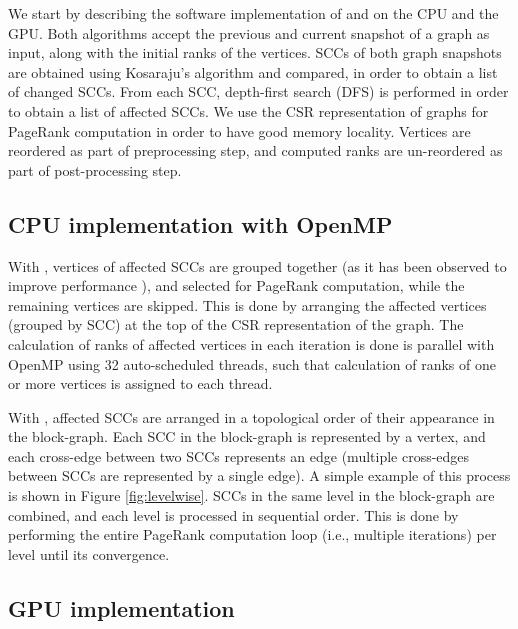 We start by describing the software implementation of \monolithicPR{} and \levelwisePR{} on the CPU and the GPU. Both algorithms accept the previous and current snapshot of a graph as input, along with the initial ranks of the vertices. SCCs of both graph snapshots are obtained using Kosaraju's algorithm \cite{scc-sharir81} and compared, in order to obtain a list of changed SCCs. From each SCC, depth-first search (DFS) is performed in order to obtain a list of affected SCCs. We use the CSR representation of graphs for PageRank computation in order to have good memory locality. Vertices are reordered as part of preprocessing step, and computed ranks are un-reordered as part of post-processing step.




\subsection{CPU implementation with OpenMP}

With \monolithicPR{}, vertices of affected SCCs are grouped together (as it has been observed to improve performance \cite{gh-levl21}), and selected for PageRank computation, while the remaining vertices are skipped. This is done by arranging the affected vertices (grouped by SCC) at the top of the CSR representation of the graph. The calculation of ranks of affected vertices in each iteration is done is parallel with OpenMP using 32 auto-scheduled threads, such that calculation of ranks of one or more vertices is assigned to each thread.

With \levelwisePR{}, affected SCCs are arranged in a topological order of their appearance in the block-graph. Each SCC in the block-graph is represented by a vertex, and each cross-edge between two SCCs represents an edge (multiple cross-edges between SCCs are represented by a single edge). A simple example of this process is shown in Figure \ref{fig:levelwise}. SCCs in the same level in the block-graph are combined, and each level is processed in sequential order. This is done by performing the entire PageRank computation loop (i.e., multiple iterations) per level until its convergence.




\subsection{GPU implementation}

